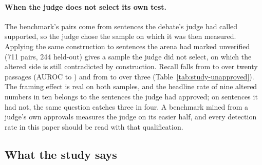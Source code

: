 \paragraph{When the judge does not select its own test.} The benchmark's pairs come from sentences the debate's judge had called supported, so the judge chose the sample on which it was then measured. Applying the same construction to sentences the arena had marked unverified (711 pairs, 244 held-out) gives a sample the judge did not select, on which the altered side is still contradicted by construction. Recall falls from \studyUnapprovedRecallBenchmarkTwoZero{} to \studyUnapprovedRecallTwoZero{} over twenty passages (AUROC \studyUnapprovedAurocBenchmarkTwoZero{} to \studyUnapprovedAurocTwoZero{}) and from \studyUnapprovedRecallBenchmarkThree{} to \studyUnapprovedRecallThree{} over three (Table~\ref{tab:study-unapproved}). The framing effect is real on both samples, and the headline rate of nine altered numbers in ten belongs to the sentences the judge had approved; on sentences it had not, the same question catches three in four. A benchmark mined from a judge's own approvals measures the judge on its easier half, and every detection rate in this paper should be read with that qualification.

\FloatBarrier
\subsection{What the study says}

